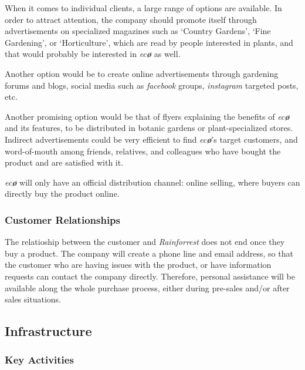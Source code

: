 \documentclass[english,runningheads,a4paper]{llncs}[2018/03/10]
\begin{document}
        When it comes to individual clients, a large range of options are
        available. In order to attract attention, the company should promote
        itself through advertisements on specialized magazines such as `Country
        Gardens', `Fine Gardening', or `Horticulture', which are read by people
        interested in plants, and that would probably be interested in
        \textit{ec\textbf{\o}} as well.

        Another option would be to create online advertisements through
        gardening forums and blogs, social media such as \textit{facebook}
        groups, \textit{instagram} targeted posts, etc. \

        Another promising option would be that of flyers explaining the benefits
        of \textit{ec\textbf{\o}} and its features, to be distributed in botanic
        gardens or plant-specialized stores. Indirect advertisements could be
        very efficient to find \textit{ec\textbf{\o}}'s target customers, and
        word-of-mouth among friends, relatives, and colleagues who have bought
        the product and are satisfied with it.

        \textit{ec\textbf{\o}} will only have an official distribution channel:
        online selling, where buyers can directly buy the product online.


        \subsubsection*{Customer Relationships}

        The relatioship between the customer and \textit{Rainforrest} does not
        end once they buy a product. The company will create a phone line and
        email address, so that the customer who are having issues with the
        product, or have information requests can contact the company directly.
        Therefore, personal assistance will be available along the whole
        purchase process, either during pre-sales and/or after sales situations.


    \subsection*{Infrastructure}

        \subsubsection*{Key Activities}
\end{document}
